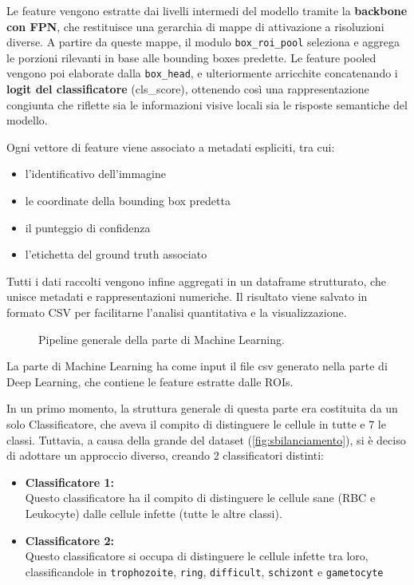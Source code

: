 \documentclass[minted, draw]{../tex/hebdomon}
\begin{document}
Le feature vengono estratte dai livelli intermedi del modello tramite la \textbf{backbone con FPN}, che restituisce una gerarchia di mappe di attivazione a risoluzioni diverse. A partire da queste mappe, il modulo \texttt{box\_roi\_pool} seleziona e aggrega le porzioni rilevanti in base alle bounding boxes predette. Le feature pooled vengono poi elaborate dalla \texttt{box\_head}, e ulteriormente arricchite concatenando i \textbf{logit del classificatore} (cls\_score), ottenendo così una rappresentazione congiunta che riflette sia le informazioni visive locali sia le risposte semantiche del modello.


Ogni vettore di feature viene associato a metadati espliciti, tra cui:
\begin{itemize}
	\item l'identificativo dell'immagine
	\item le coordinate della bounding box predetta
	\item il punteggio di confidenza
	\item l’etichetta del ground truth associato
\end{itemize}
 

Tutti i dati raccolti vengono infine aggregati in un dataframe strutturato, che unisce metadati e rappresentazioni numeriche. Il risultato viene salvato in formato CSV per facilitarne l’analisi quantitativa e la visualizzazione.



%
\begin{figure}[H]
	\centering
	
	\caption{Pipeline generale della parte di Machine Learning.}
\end{figure}
%
La parte di Machine Learning ha come input il file csv generato nella parte di Deep Learning, che contiene le feature estratte dalle ROIs.

In un primo momento, la struttura generale di questa parte era costituita da un solo Classificatore, che aveva il compito di distinguere le cellule in tutte e 7 le classi. Tuttavia, a causa della grande  del dataset (\ref{fig:sbilanciamento}), si è deciso di adottare un approccio diverso, creando 2 classificatori distinti:
\begin{itemize}
	\item \textbf{Classificatore 1:}  \\
	Questo classificatore ha il compito di distinguere le cellule sane (RBC e Leukocyte) dalle cellule infette (tutte le altre classi).
	\item \textbf{Classificatore 2:}  \\
	Questo classificatore si occupa di distinguere le cellule infette tra loro, classificandole in \texttt{trophozoite}, \texttt{ring}, \texttt{difficult}, \texttt{schizont} e \texttt{gametocyte}
\end{itemize}
\end{document}
